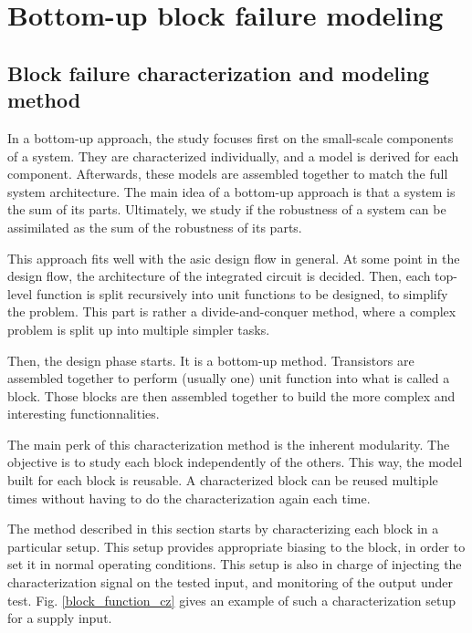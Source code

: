 \section{Bottom-up block failure modeling}
\label{sec:bottom-up-modeling}

\subsection{Block failure characterization and modeling method}
\label{sec:block-failure-cz}

In a bottom-up approach, the study focuses first on the small-scale components of a system.
They are characterized individually, and a model is derived for each component.
Afterwards, these models are assembled together to match the full system architecture.
The main idea of a bottom-up approach is that a system is the sum of its parts.
Ultimately, we study if the robustness of a system can be assimilated as the sum of the robustness of its parts.

This approach fits well with the \gls{asic} design flow in general.
At some point in the design flow, the architecture of the integrated circuit is decided.
Then, each top-level function is split recursively into unit functions to be designed, to simplify the problem.
This part is rather a divide-and-conquer method, where a complex problem is split up into multiple simpler tasks.

Then, the design phase starts. It is a bottom-up method.
Transistors are assembled together to perform (usually one) unit function into what is called a \gls{block}.
Those blocks are then assembled together to build the more complex and interesting functionnalities.

The main perk of this characterization method is the inherent modularity.
The objective is to study each block independently of the others.
This way, the model built for each block is reusable.
A characterized block can be reused multiple times without having to do the characterization again each time.

The method described in this section starts by characterizing each block in a particular setup.
This setup provides appropriate biasing to the block, in order to set it in normal operating conditions.
This setup is also in charge of injecting the characterization signal on the tested input, and monitoring of the output under test.
Fig. \ref{block_function_cz} gives an example of such a characterization setup for a supply input.

